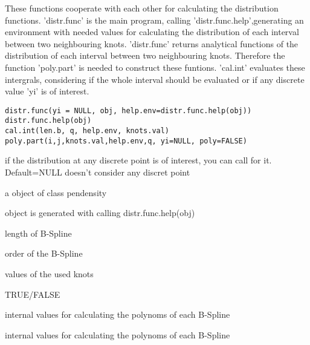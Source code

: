 \begin{Description}\relax
These functions cooperate with each other for calculating the distribution functions. 'distr.func' is the main program, calling 'distr.func.help',generating an environment with needed values for calculating the distribution of each interval between two neighbouring knots. 'distr.func' returns analytical functions of the distribution of each interval between two neighbouring knots. Therefore the function 'poly.part' is needed to construct these funtions. 'cal.int' evaluates these intergrals, considering if the whole interval should be evaluated or if any discrete value 'yi' is of interest.
\end{Description}
\begin{Usage}
\begin{verbatim}
distr.func(yi = NULL, obj, help.env=distr.func.help(obj))
distr.func.help(obj)
cal.int(len.b, q, help.env, knots.val)
poly.part(i,j,knots.val,help.env,q, yi=NULL, poly=FALSE)
\end{verbatim}
\end{Usage}
\begin{Arguments}
\begin{ldescription}
\item[\code{yi}] if the distribution at any discrete point is of interest, you can call for it. Default=NULL doesn't consider any discret point 
\item[\code{obj}] a object of class pendensity
\item[\code{help.env}] object is generated with calling distr.func.help(obj)
\item[\code{len.b}] length of B-Spline
\item[\code{q}] order of the B-Spline
\item[\code{knots.val}] values of the used knots
\item[\code{poly}] TRUE/FALSE
\item[\code{i}] internal values for calculating the polynoms of each B-Spline
\item[\code{j}] internal values for calculating the polynoms of each B-Spline
\end{ldescription}
\end{Arguments}
